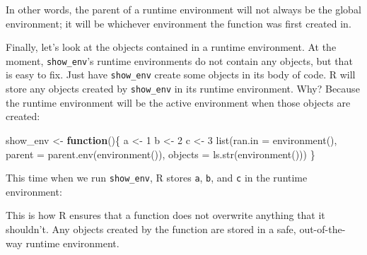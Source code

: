 \documentclass[
  letterpaper,
  DIV=11,
  numbers=noendperiod]{scrbook}
\newenvironment{Shaded}{\begin{snugshade}}{\end{snugshade}}
\newcommand{\AttributeTok}[1]{\textcolor[rgb]{0.40,0.45,0.13}{#1}}
\newcommand{\ControlFlowTok}[1]{\textcolor[rgb]{0.00,0.23,0.31}{\textbf{#1}}}
\newcommand{\DecValTok}[1]{\textcolor[rgb]{0.68,0.00,0.00}{#1}}
\newcommand{\DocumentationTok}[1]{\textcolor[rgb]{0.37,0.37,0.37}{\textit{#1}}}
\newcommand{\FunctionTok}[1]{\textcolor[rgb]{0.28,0.35,0.67}{#1}}
\newcommand{\NormalTok}[1]{\textcolor[rgb]{0.00,0.23,0.31}{#1}}
\newcommand{\OtherTok}[1]{\textcolor[rgb]{0.00,0.23,0.31}{#1}}
\begin{document}
In other words, the parent of a runtime environment will not always be
the global environment; it will be whichever environment the function
was first created in.

Finally, let's look at the objects contained in a runtime environment.
At the moment, \texttt{show\_env}'s runtime environments do not contain
any objects, but that is easy to fix. Just have \texttt{show\_env}
create some objects in its body of code. R will store any objects
created by \texttt{show\_env} in its runtime environment. Why? Because
the runtime environment will be the active environment when those
objects are created:

\begin{Shaded}
\begin{Highlighting}[]
\NormalTok{show\_env }\OtherTok{\textless{}{-}} \ControlFlowTok{function}\NormalTok{()\{}
\NormalTok{  a }\OtherTok{\textless{}{-}} \DecValTok{1}
\NormalTok{  b }\OtherTok{\textless{}{-}} \DecValTok{2}
\NormalTok{  c }\OtherTok{\textless{}{-}} \DecValTok{3}
  \FunctionTok{list}\NormalTok{(}\AttributeTok{ran.in =} \FunctionTok{environment}\NormalTok{(), }
    \AttributeTok{parent =} \FunctionTok{parent.env}\NormalTok{(}\FunctionTok{environment}\NormalTok{()), }
    \AttributeTok{objects =} \FunctionTok{ls.str}\NormalTok{(}\FunctionTok{environment}\NormalTok{()))}
\NormalTok{\}}
\end{Highlighting}
\end{Shaded}

This time when we run \texttt{show\_env}, R stores \texttt{a},
\texttt{b}, and \texttt{c} in the runtime environment:

\begin{Shaded}
\end{Shaded}

This is how R ensures that a function does not overwrite anything that
it shouldn't. Any objects created by the function are stored in a safe,
out-of-the-way runtime environment.
\end{document}
